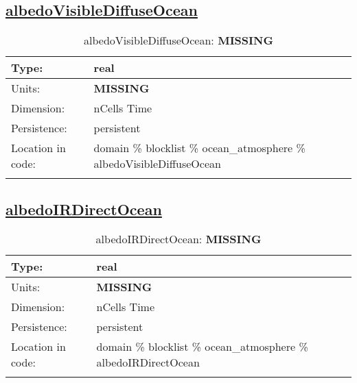 \subsection[albedoVisibleDiffuseOcean]{\hyperref[sec:var_tab_ocean_atmosphere]{albedoVisibleDiffuseOcean}}
\label{subsec:var_sec_ocean_atmosphere_albedoVisibleDiffuseOcean}
\begin{center}
\begin{longtable}{| p{2.0in} | p{4.0in} |}
        \hline 
        Type: & real \\
        \hline 
        Units: & {\bf \color{red} MISSING} \\
        \hline 
        Dimension: & nCells Time \\
        \hline 
        Persistence: & persistent \\
        \hline 
         Location in code: & domain \% blocklist \% ocean\_atmosphere \% albedoVisibleDiffuseOcean \\
         \hline 
    \caption{albedoVisibleDiffuseOcean: {\bf \color{red} MISSING}}
\end{longtable}
\end{center}
\subsection[albedoIRDirectOcean]{\hyperref[sec:var_tab_ocean_atmosphere]{albedoIRDirectOcean}}
\label{subsec:var_sec_ocean_atmosphere_albedoIRDirectOcean}
\begin{center}
\begin{longtable}{| p{2.0in} | p{4.0in} |}
        \hline 
        Type: & real \\
        \hline 
        Units: & {\bf \color{red} MISSING} \\
        \hline 
        Dimension: & nCells Time \\
        \hline 
        Persistence: & persistent \\
        \hline 
         Location in code: & domain \% blocklist \% ocean\_atmosphere \% albedoIRDirectOcean \\
         \hline 
    \caption{albedoIRDirectOcean: {\bf \color{red} MISSING}}
\end{longtable}
\end{center}
